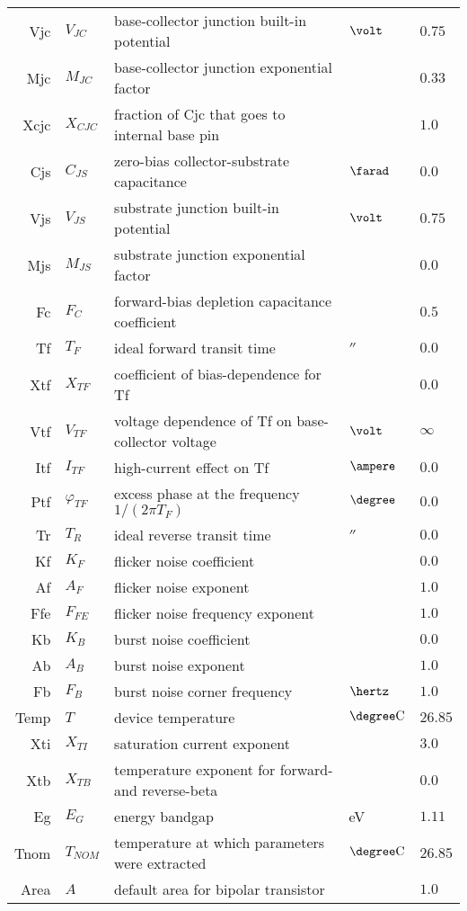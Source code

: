 \begin{longtable}{rllll}
Vjc & $V_{JC}$ & base-collector junction built-in potential & $\volt$ & $0.75$\\
Mjc & $M_{JC}$ & base-collector junction exponential factor & & $0.33$\\
Xcjc & $X_{CJC}$ & fraction of Cjc that goes to internal base pin & & $1.0$\\
Cjs & $C_{JS}$ & zero-bias collector-substrate capacitance & $\farad$ & $0.0$\\
Vjs & $V_{JS}$ & substrate junction built-in potential & $\volt$ & $0.75$\\
Mjs & $M_{JS}$ & substrate junction exponential factor & & $0.0$\\
Fc & $F_C$ & forward-bias depletion capacitance coefficient & & $0.5$\\
Tf & $T_F$ & ideal forward transit time & $\second$ & $0.0$\\
Xtf & $X_{TF}$ & coefficient of bias-dependence for Tf & & $0.0$\\
Vtf & $V_{TF}$ & voltage dependence of Tf on base-collector voltage & $\volt$ & $\infty$\\
Itf & $I_{TF}$ & high-current effect on Tf & $\ampere$ & $0.0$\\
Ptf & $\varphi_{TF}$ & excess phase at the frequency $1/(2\pi T_F)$ & $\degree$ & $0.0$\\
Tr & $T_R$ & ideal reverse transit time & $\second$ & $0.0$\\
Kf & $K_F$ & flicker noise coefficient & & $0.0$\\
Af & $A_F$ & flicker noise exponent & & $1.0$\\
Ffe & $F_{FE}$ & flicker noise frequency exponent & & $1.0$\\
Kb & $K_B$ & burst noise coefficient & & $0.0$\\
Ab & $A_B$ & burst noise exponent & & $1.0$\\
Fb & $F_B$ & burst noise corner frequency & $\hertz$ & $1.0$\\
Temp & $T$ & device temperature & $\degree \mathrm{C}$ & $26.85$\\
Xti & $X_{TI}$ & saturation current exponent & & $3.0$\\
Xtb & $X_{TB}$ & temperature exponent for forward- and reverse-beta & & $0.0$\\
Eg & $E_G$ & energy bandgap & eV & $1.11$\\
Tnom & $T_{NOM}$ & temperature at which parameters were extracted & $\degree \mathrm{C}$ & $26.85$\\
Area & $A$ & default area for bipolar transistor & & $1.0$
\end{longtable}

